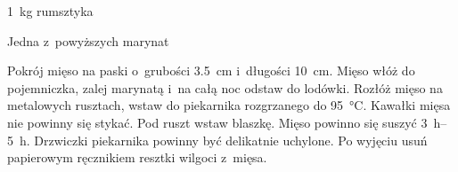 \documentclass[../main.tex]{subfiles}
\begin{document}

\begin{Ingred}
    \item \qty{1}{\kilo\gram} rumsztyka
    \item Jedna z~powyższych marynat
\end{Ingred}

Pokrój mięso na paski o~grubości \qty{3.5}{\centi\metre} i~długości
\qty{10}{\centi\metre}. Mięso włóż do pojemniczka, zalej marynatą i~na całą noc
odstaw do lodówki. Rozłóż mięso na metalowych rusztach, wstaw do piekarnika
rozgrzanego do \qty{95}{\celsius}. Kawałki mięsa nie powinny się stykać. Pod
ruszt wstaw blaszkę. Mięso powinno się suszyć \qtyrange{3}{5}{\hour}. Drzwiczki
piekarnika powinny być delikatnie uchylone. Po wyjęciu usuń papierowym
ręcznikiem resztki wilgoci z~mięsa.
\end{document}
